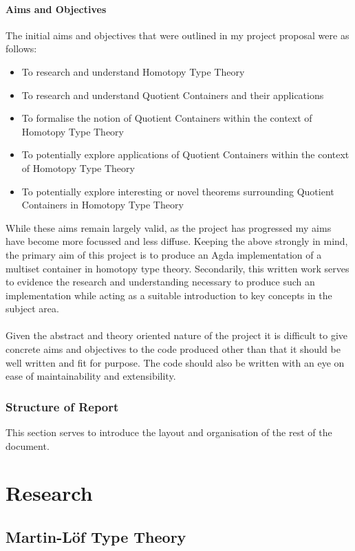 \documentclass[12pt]{report}
\begin{document}
\subsection{Aims and Objectives}
The initial aims and objectives that were outlined in my project proposal were as follows:
\begin{itemize}
\item To research and understand Homotopy Type Theory
\item To research and understand Quotient Containers and their applications
\item To formalise the notion of Quotient Containers within the context of Homotopy Type Theory
\item To potentially explore applications of Quotient Containers within the context of Homotopy Type Theory
\item To potentially explore interesting or novel theorems surrounding Quotient Containers in Homotopy Type Theory
\end{itemize}

While these aims remain largely valid, as the project has progressed my aims have become more focussed and less diffuse. Keeping the above strongly in mind, the primary aim of this project is to produce an Agda implementation of a multiset container in homotopy type theory. Secondarily, this  written work serves to evidence the research and understanding necessary to produce such an implementation while acting as a suitable introduction to key concepts in the subject area.\\
\\
Given the abstract and theory oriented nature of the project it is difficult to give concrete aims and objectives to the code produced other than that it should be well written and fit for purpose. The code should also be written with an eye on ease of maintainability and extensibility. 

\section{Structure of Report}
This section serves to introduce the layout and organisation of the rest of the document. 



\part{Research}
\chapter{Martin-L\"of Type Theory}
\end{document}
